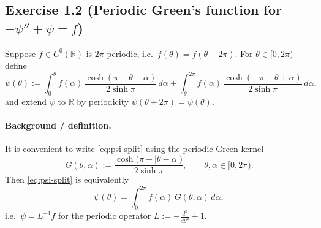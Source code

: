 
\subsection*{Exercise 1.2 (Periodic Green's function for $-\psi''+\psi=f$)}
Suppose $f\in C^0(\mathbb{R})$ is $2\pi$-periodic, i.e.\ $f(\theta)=f(\theta+2\pi)$. For $\theta\in[0,2\pi)$ define
\begin{equation}\label{eq:psi-split}
\psi(\theta):=\int_{0}^{\theta} f(\alpha)\,\frac{\cosh(\pi-\theta+\alpha)}{2\sinh\pi}\,d\alpha
+\int_{\theta}^{2\pi} f(\alpha)\,\frac{\cosh(-\pi-\theta+\alpha)}{2\sinh\pi}\,d\alpha,
\end{equation}
and extend $\psi$ to $\mathbb{R}$ by periodicity $\psi(\theta+2\pi)=\psi(\theta)$.

\paragraph{Background / definition.}
It is convenient to write \eqref{eq:psi-split} using the periodic Green kernel
\begin{equation}\label{eq:Gdef}
G(\theta,\alpha):=\frac{\cosh\!\big(\pi-|\theta-\alpha|\big)}{2\sinh\pi},\qquad \theta,\alpha\in[0,2\pi).
\end{equation}
Then \eqref{eq:psi-split} is equivalently
\begin{equation}\label{eq:psi-conv}
\psi(\theta)=\int_{0}^{2\pi} f(\alpha)\,G(\theta,\alpha)\,d\alpha,
\end{equation}
i.e.\ $\psi=L^{-1}f$ for the periodic operator $L:=-\frac{d^2}{d\theta^2}+1$.

